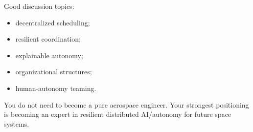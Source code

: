 \documentclass[10pt,a4paper,twocolumn]{article}
\begin{document}
Good discussion topics:
\begin{itemize}
    \item decentralized scheduling;
    \item resilient coordination;
    \item explainable autonomy;
    \item organizational structures;
    \item human-autonomy teaming.
\end{itemize}


\begin{keybox}
    You do not need to become a pure aerospace engineer.
    Your strongest positioning is becoming an expert in resilient distributed AI/autonomy for future space systems.
\end{keybox}
\end{document}
